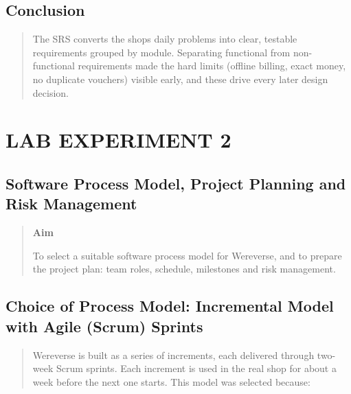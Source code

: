\documentclass[12pt,a4paper]{article}
\begin{document}
\subsection{Conclusion}\label{conclusion}

\begin{quote}
The SRS converts the shop\textquotesingle s daily problems into clear,
testable requirements grouped by module. Separating functional from
non-functional requirements made the hard limits (offline billing, exact
money, no duplicate vouchers) visible early, and these drive every later
design decision.
\end{quote}

\clearpage
\section{LAB EXPERIMENT 2}\label{lab-experiment-2}

\subsection{Software Process Model, Project Planning and Risk
Management}\label{software-process-model-project-planning-and-risk-management}

\begin{quote}
\textbf{Aim}

To select a suitable software process model for Wereverse, and to
prepare the project plan: team roles, schedule, milestones and risk
management.
\end{quote}

\subsection{Choice of Process Model: Incremental Model with Agile (Scrum)
Sprints}\label{choice-of-process-model-incremental-model-with-agile-scrum-sprints}

\begin{quote}
Wereverse is built as a series of increments, each delivered through
two-week Scrum sprints. Each increment is used in the real shop for
about a week before the next one starts. This model was selected
because:
\end{quote}
\end{document}
